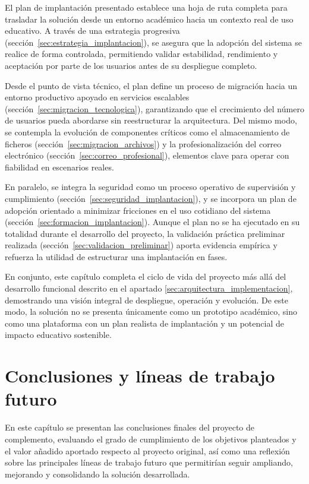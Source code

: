 El plan de implantación presentado establece una hoja de ruta completa para trasladar la solución desde un entorno académico hacia un contexto real de uso educativo. A través de una estrategia progresiva (sección~\ref{sec:estrategia_implantacion}), se asegura que la adopción del sistema se realice de forma controlada, permitiendo validar estabilidad, rendimiento y aceptación por parte de los usuarios antes de su despliegue completo.

Desde el punto de vista técnico, el plan define un proceso de migración hacia un entorno productivo apoyado en servicios escalables (sección~\ref{sec:migracion_tecnologica}), garantizando que el crecimiento del número de usuarios pueda abordarse sin reestructurar la arquitectura. Del mismo modo, se contempla la evolución de componentes críticos como el almacenamiento de ficheros (sección~\ref{sec:migracion_archivos}) y la profesionalización del correo electrónico (sección~\ref{sec:correo_profesional}), elementos clave para operar con fiabilidad en escenarios reales.

En paralelo, se integra la seguridad como un proceso operativo de supervisión y cumplimiento (sección~\ref{sec:seguridad_implantacion}), y se incorpora un plan de adopción orientado a minimizar fricciones en el uso cotidiano del sistema (sección~\ref{sec:formacion_implantacion}). Aunque el plan no se ha ejecutado en su totalidad durante el desarrollo del proyecto, la validación práctica preliminar realizada (sección~\ref{sec:validacion_preliminar}) aporta evidencia empírica y refuerza la utilidad de estructurar una implantación en fases.

En conjunto, este capítulo completa el ciclo de vida del proyecto más allá del desarrollo funcional descrito en el apartado \ref{sec:arquitectura_implementacion}, demostrando una visión integral de despliegue, operación y evolución. De este modo, la solución no se presenta únicamente como un prototipo académico, sino como una plataforma con un plan realista de implantación y un potencial de impacto educativo sostenible.

\chapter{Conclusiones y líneas de trabajo futuro}
\label{chap:conclusiones_complemento}

En este capítulo se presentan las conclusiones finales del proyecto de complemento, evaluando el grado de cumplimiento de los objetivos planteados y el valor añadido aportado respecto al proyecto original, así como una reflexión sobre las principales líneas de trabajo futuro que permitirían seguir ampliando, mejorando y consolidando la solución desarrollada.

